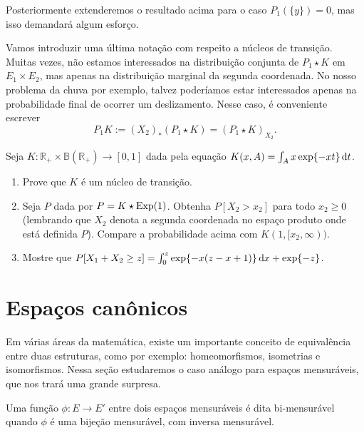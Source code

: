 Posteriormente extenderemos o resultado acima para o caso $P_1(\{y\}) = 0$, mas isso demandará algum esforço.

Vamos introduzir uma última notação com respeito a núcleos de transição.
Muitas vezes, não estamos interessados na distribuição conjunta de $P_1 \star K$ em $E_1 \times E_2$, mas apenas na distribuição marginal da segunda coordenada.
No nosso problema da chuva por exemplo, talvez poderíamos estar interessados apenas na probabilidade final de ocorrer um deslizamento.
Nesse caso, é conveniente escrever
\begin{equation}
  \label{e:P1_K}
  P_1 K := (X_2)_*(P_1 \star K) = (P_1 \star K)_{X_2}.
\end{equation}

\begin{exercise}
  Seja $K:\mathbb{R}_+ \times \mathbb{B}(\mathbb{R}_+) \to [0,1]$ dada pela equação $K(x,A) = \int_A x \exp\{-x t\} \mathop{}\!\mathrm{d} t$.
  \begin{enumerate}[\quad a)]
  \item Prove que $K$ \'e um n\'ucleo de transi\c{c}\~ao.
  \item Seja $P$ dada por $P = K \star \textnormal{Exp}(1)$.
    Obtenha $P[X_2 > x_2]$ para todo $x_2 \geq 0$ (lembrando que $X_2$ denota a segunda coordenada no espa\c{c}o produto onde est\'a definida $P$).
    Compare a probabilidade acima com $K(1,[x_2, \infty))$.
  \item Mostre que $P[X_1 + X_2 \geq z] = \int_0^z \exp \{-x(z-x+1)\} \mathop{}\!\mathrm{d} x + \exp\{-z\}$.
  \end{enumerate}
\end{exercise}

\vfill
\pagebreak

\section{Espaços canônicos}

Em várias áreas da matemática, existe um importante conceito de equivalência entre duas estruturas, como por exemplo: homeomorfismos, isometrias e isomorfismos.
Nessa seção estudaremos o caso análogo para espaços mensuráveis, que nos trará uma grande surpresa.

\begin{definition}
  Uma função $\phi:E \to E'$ entre dois espaços mensuráveis é dita bi-mensurável  quando $\phi$ é uma bijeção mensurável, com inversa mensurável.
\end{definition}

